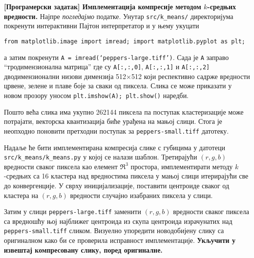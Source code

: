 \item{}
\textbf{[Програмерски задатак] Имплементација компресије методом $k$-средњих вредности.}
Најпре \emph{погледајмо} податке. Унутар \texttt{src/k\_means/} директоријума покренути интерактивни Пајтон интерпретатор и у њему укуцати
%
\begin{center}
  \texttt{from matplotlib.image import imread; import matplotlib.pyplot as plt;}
\end{center}
%
а затим покренути \texttt{A = imread(`peppers-large.tiff')}. Сада је \texttt{A} заправо ``тродимензионална матрица'' где су \texttt{A[:,:,0]}, \texttt{A[:,:,1]} и \texttt{A[:,:,2]} дводимензионални низови димензија 512$\times$512 који респективно садрже вредности црвене, зелене и плаве боје за сваки од пиксела. Слика се може приказати у новом прозору уносом \texttt{plt.imshow(A); plt.show()} наредби.

Пошто већа слика има укупно 262144 пиксела па поступак кластеризације може потрајати, векторска квантизација биће урађена на мањој слици. Стога је неопходно поновити претходни поступак за \texttt{peppers-small.tiff} датотеку.

Надаље ће бити имплементирана компресија слике с губицима у датотеци \texttt{src/k\_means/k\_means.py} у којој се налази шаблон. Третирајући $(r, g, b)$ вредности сваког пиксела као елемент $\Re^3$ простора, имплементирати методу $k$-средњих са 16 кластера над вредностима пиксела у мањој слици итерирајући све до конвергенције. У сврху иницијализације, поставити центроиде сваког од кластера на $(r, g, b)$ вредности случајно изабраних пиксела у слици.

Затим у слици \texttt{peppers-large.tiff} заменити $(r, g, b)$ вредности сваког пиксела са вредношћу њој најближег центроида из скупа центроида израчунатих над \texttt{peppers-small.tiff} сликом. Визуелно упоредити новодобијену слику са оригиналном како би се проверила исправност имплементације. \textbf{Укључити у извештај компресовану слику, поред оригиналне.}

